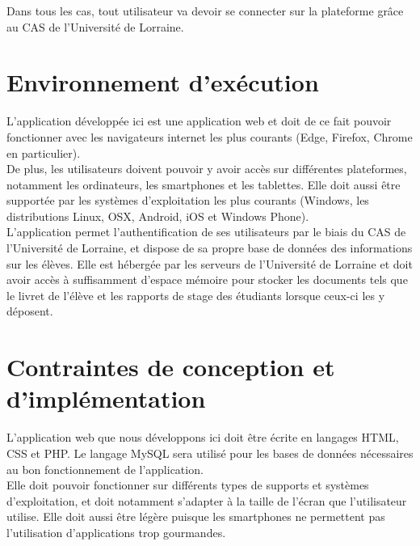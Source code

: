 \documentclass{scrreprt}
\begin{document}
\hspace{0.6cm}Dans tous les cas, tout utilisateur va devoir se connecter sur la plateforme grâce au CAS de l'Université de Lorraine.

\section{Environnement d'exécution}
\hspace{1cm}L'application développée ici est une application web et doit de ce fait pouvoir fonctionner avec les navigateurs internet les plus courants (Edge, Firefox, Chrome en particulier).\\

\hspace{0.6cm}De plus, les utilisateurs doivent pouvoir y avoir accès sur différentes plateformes, notamment les ordinateurs, les smartphones et les tablettes. Elle doit aussi être supportée par les systèmes d'exploitation les plus courants (Windows, les distributions Linux, OSX, Android, iOS et Windows Phone).\\

\hspace{0.6cm}L'application permet l'authentification de ses utilisateurs par le biais du CAS de l'Université de Lorraine, et dispose de sa propre base de données des informations sur les élèves. Elle est hébergée par les serveurs de l'Université de Lorraine et doit avoir accès à suffisamment d'espace mémoire pour stocker les documents tels que le livret de l'élève et les rapports de stage des étudiants lorsque ceux-ci les y déposent.


\section{Contraintes de conception et d'implémentation}
\hspace{1cm}L'application web que nous développons ici doit être écrite en langages HTML, CSS et PHP. Le langage MySQL sera utilisé pour les bases de données nécessaires au bon fonctionnement de l'application.\\

\hspace{0.6cm}Elle doit pouvoir fonctionner sur différents types de supports et systèmes d'exploitation, et doit notamment s'adapter à la taille de l'écran que l'utilisateur utilise. Elle doit aussi être légère puisque les smartphones ne permettent pas l'utilisation d'applications trop gourmandes.\\
\end{document}
